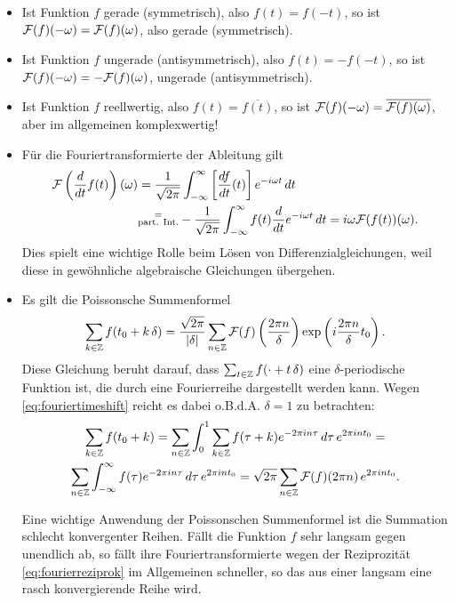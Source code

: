 \begin{itemize}
\item Ist Funktion $f$ gerade (symmetrisch), also $f(t) = f(-t)$, so ist
  $\mathcal F(f)(-\omega) = \mathcal F(f)(\omega)$, also gerade (symmetrisch).
\item Ist Funktion $f$ ungerade (antisymmetrisch), also $f(t) = -f(-t)$, so ist
  $\mathcal F(f)(-\omega) = -\mathcal F(f)(\omega)$, ungerade (antisymmetrisch).
\item Ist Funktion $f$ reellwertig, also $f(t) = \overline{f(t)}$, so
  ist $\mathcal F(f)(-\omega) = \overline{\mathcal F(f)(\omega)}$, aber im
  allgemeinen komplexwertig!
\item Für die Fouriertransformierte der Ableitung gilt
  \begin{equation}
    \begin{split}
      \mathcal F\left(\frac{d}{dt}f(t)\right)(\omega) &=
      \frac{1}{\sqrt{2\pi}}\int_{-\infty}^{\infty}
      \left[\frac{df}{dt}(t)\right]e^{-i
        \omega t}\, dt\\
      &\substack{=\\\text{part. Int.}} -\frac{1}{\sqrt{2\pi}}\int_{-\infty}^{\infty}
      f(t)\frac{d}{dt}e^{-i \omega t}\, dt = i\omega
      \mathcal F(f(t))(\omega).
    \end{split}
  \end{equation}
  Dies spielt eine wichtige Rolle beim Lösen von
  Differenzialgleichungen, weil diese in gewöhnliche algebraische
  Gleichungen übergehen.
\item Es gilt die Poissonsche Summenformel
  \begin{equation}
    \label{eq:poissonsumme}
    \sum_{k\in\mathbb{Z}}f(t_0 + k\, \delta)=
    \frac{\sqrt{2\pi}}{|\delta|}\sum_{n\in\mathbb{Z}}\mathcal F(f)
    \left(\frac{2\pi n}{\delta}\right)
    \exp\left(i \frac{2\pi n}{\delta} t_0\right).
  \end{equation}
  Diese Gleichung beruht darauf, dass $\sum_{t\in\mathbb{Z}}f(\cdot + t\,
  \delta)$ eine $\delta$-periodische Funktion ist, die durch eine
  Fourierreihe dargestellt werden kann. Wegen
  \eqref{eq:fouriertimeshift} reicht es
  dabei o.B.d.A. $\delta=1$ zu
  betrachten:
  \begin{multline}
    \sum_{k\in\mathbb{Z}}f(t_0 + k) =
    \sum_{n\in\mathbb{Z}} \int_0^1 \sum_{k\in\mathbb{Z}}f(\tau + k)e^{-2\pi i
      n \tau}\, d\tau
    \, e^{2\pi i n t_0} =\\
    \sum_{n\in\mathbb{Z}} \int_{-\infty}^\infty f(\tau)e^{-2\pi i
      n \tau}\, d\tau
    \, e^{2\pi i n t_0}
    = \sqrt{2\pi}\sum_{n\in\mathbb{Z}}\mathcal F(f)(2\pi n)\, e^{2\pi i n t_0}.
  \end{multline}

  Eine wichtige Anwendung der Poissonschen Summenformel ist die
  Summation schlecht konvergenter Reihen. Fällt die Funktion $f$ sehr
  langsam gegen unendlich ab, so fällt ihre Fouriertransformierte
  wegen der Reziprozität \eqref{eq:fourierreziprok} im Allgemeinen
  schneller, so das aus einer langsam eine rasch konvergierende Reihe
  wird.
\end{itemize}

